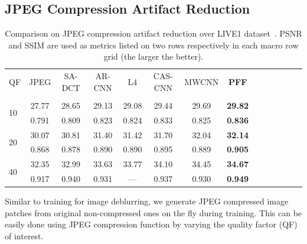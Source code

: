 \documentclass[10pt,twocolumn,letterpaper]{article}
\begin{document}
\subsection{JPEG Compression Artifact Reduction}



{
\setlength{\tabcolsep}{0.26em} %
\begin{table}[t]
\centering
\caption{Comparison on JPEG compression artifact reduction over LIVE1 dataset~\cite{wang2004image}.
PSNR and SSIM are used as metrics listed on two rows respectively in each macro row grid
(the larger the better). }
\vspace{-1mm}
\footnotesize
\begin{tabular}{l | c c c c c c c c c c c c c} %
\hline
QF      & JPEG &  SA-DCT &  AR-CNN & L4 & CAS-CNN & MWCNN  & {\bf PFF} \\
& & \cite{foi2007pointwise} &  \cite{dong2015compression} & \cite{svoboda2016compression}
 & \cite{cavigelli2017cas}  &  \cite{liu2018multi} & \\
\hline
\multirow{2}{*}{10}
        & 27.77 & 28.65 & 29.13     & 29.08 & 29.44  & 29.69  & {\bf 29.82}  \\
        & 0.791 & 0.809 & 0.823     & 0.824 & 0.833  & 0.825  & {\bf 0.836}  \\
\hline
\multirow{2}{*}{20}
        & 30.07 & 30.81 & 31.40     & 31.42 & 31.70  & 32.04  & {\bf 32.14}  \\
        & 0.868 & 0.878 & 0.890     & 0.890 & 0.895  & 0.889  & {\bf 0.905}  \\
\hline
\multirow{2}{*}{40}
        & 32.35 & 32.99 & 33.63     & 33.77 & 34.10  & 34.45  & {\bf 34.67}  \\
        & 0.917 & 0.940 & 0.931     & ---   & 0.937  & 0.930  & {\bf 0.949}  \\
\hline
\end{tabular}
\label{tab:compare_motion_deblur2}
\end{table}
}

Similar to training for image deblurring,
we generate JPEG compressed image patches from original non-compressed ones
on the fly during training.
This can be easily done using JPEG compression function by varying the
quality factor (QF) of interest.
\end{document}
